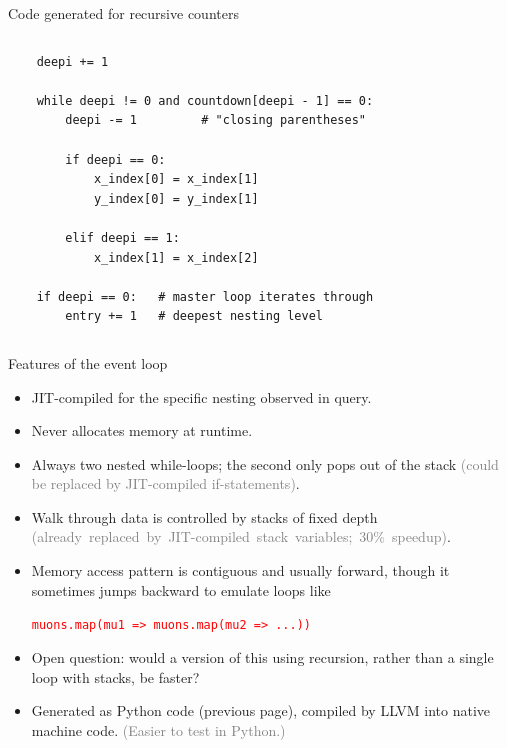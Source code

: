 \documentclass{beamer}
\begin{document}
\begin{frame}[fragile]{Code generated for recursive counters}
\begin{columns}[t]
\begin{verbatim}
    deepi += 1

    while deepi != 0 and countdown[deepi - 1] == 0:
        deepi -= 1         # "closing parentheses"

        if deepi == 0:
            x_index[0] = x_index[1]
            y_index[0] = y_index[1]

        elif deepi == 1:
            x_index[1] = x_index[2]

    if deepi == 0:   # master loop iterates through
        entry += 1   # deepest nesting level
\end{verbatim}
\end{columns}
\end{frame}

\begin{frame}{Features of the event loop}
\vspace{0.4 cm}
\begin{itemize}\setlength{\itemsep}{0.2 cm}
\item JIT-compiled for the specific nesting observed in query.
\item Never allocates memory at runtime.
\item Always two nested while-loops; the second only pops out of the stack \textcolor{gray}{(could be replaced by JIT-compiled if-statements)}.
\item Walk through data is controlled by stacks of fixed depth \mbox{\textcolor{gray}{(already replaced by JIT-compiled stack variables; 30\% speedup)}.\hspace{-1 cm}}
\item Memory access pattern is contiguous and usually forward, though it sometimes jumps backward to emulate loops like
\begin{center}
\textcolor{red}{\tt muons.map(mu1 => muons.map(mu2 => ...))}
\end{center}
\item Open question: would a version of this using recursion, rather than a single loop with stacks, be faster?
\item Generated as Python code (previous page), compiled by LLVM into native machine code. \textcolor{gray}{(Easier to test in Python.)}
\end{itemize}
\end{frame}
\end{document}
